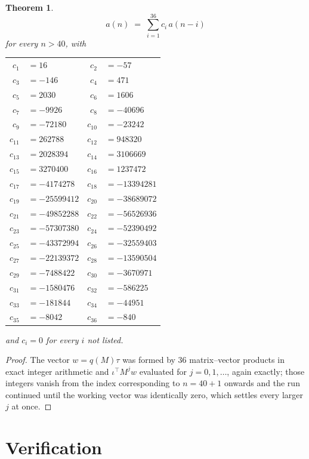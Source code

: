 \documentclass[11pt,a4paper]{article}
\theoremstyle{plain}
\newtheorem{theorem}{Theorem}
\theoremstyle{definition}
\begin{document}
\begin{theorem}
\[
a(n)\;=\;\sum_{i=1}^{36}c_i\,a(n-i)
\]
for every $n>40$, with
\begin{center}\footnotesize
\begin{tabular}{r@{\,}l@{\qquad}r@{\,}l}
$c_{1}$ & $=16$ & $c_{2}$ & $=-57$ \\
$c_{3}$ & $=-146$ & $c_{4}$ & $=471$ \\
$c_{5}$ & $=2030$ & $c_{6}$ & $=1606$ \\
$c_{7}$ & $=-9926$ & $c_{8}$ & $=-40696$ \\
$c_{9}$ & $=-72180$ & $c_{10}$ & $=-23242$ \\
$c_{11}$ & $=262788$ & $c_{12}$ & $=948320$ \\
$c_{13}$ & $=2028394$ & $c_{14}$ & $=3106669$ \\
$c_{15}$ & $=3270400$ & $c_{16}$ & $=1237472$ \\
$c_{17}$ & $=-4174278$ & $c_{18}$ & $=-13394281$ \\
$c_{19}$ & $=-25599412$ & $c_{20}$ & $=-38689072$ \\
$c_{21}$ & $=-49852288$ & $c_{22}$ & $=-56526936$ \\
$c_{23}$ & $=-57307380$ & $c_{24}$ & $=-52390492$ \\
$c_{25}$ & $=-43372994$ & $c_{26}$ & $=-32559403$ \\
$c_{27}$ & $=-22139372$ & $c_{28}$ & $=-13590504$ \\
$c_{29}$ & $=-7488422$ & $c_{30}$ & $=-3670971$ \\
$c_{31}$ & $=-1580476$ & $c_{32}$ & $=-586225$ \\
$c_{33}$ & $=-181844$ & $c_{34}$ & $=-44951$ \\
$c_{35}$ & $=-8042$ & $c_{36}$ & $=-840$ \\
\end{tabular}
\end{center}
and $c_i=0$ for every $i$ not listed.
\end{theorem}

\begin{proof}
The vector $w=q(M)\tau$ was formed by $36$ matrix--vector products in exact integer
arithmetic and $\iota^{\!\top}M^{j}w$ evaluated for $j=0,1,\dots$, again exactly; those
integers vanish from the index corresponding to $n=40+1$ onwards and the run continued
until the working vector was identically zero, which settles every larger $j$ at once.
\end{proof}

\section{Verification}
\end{document}
